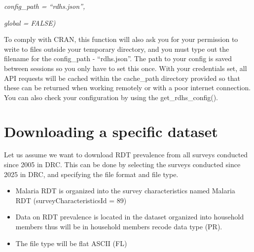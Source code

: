 \documentclass[
  letterpaper,
  DIV=11,
  numbers=noendperiod]{scrreprt}
\newenvironment{Shaded}{\begin{snugshade}}{\end{snugshade}}
\newcommand{\AttributeTok}[1]{\textcolor[rgb]{0.40,0.45,0.13}{#1}}
\newcommand{\CommentTok}[1]{\textcolor[rgb]{0.37,0.37,0.37}{#1}}
\newcommand{\DecValTok}[1]{\textcolor[rgb]{0.68,0.00,0.00}{#1}}
\newcommand{\FunctionTok}[1]{\textcolor[rgb]{0.28,0.35,0.67}{#1}}
\newcommand{\NormalTok}[1]{\textcolor[rgb]{0.00,0.23,0.31}{#1}}
\newcommand{\OtherTok}[1]{\textcolor[rgb]{0.00,0.23,0.31}{#1}}
\newcommand{\StringTok}[1]{\textcolor[rgb]{0.13,0.47,0.30}{#1}}
\begin{document}
\emph{config\_path = ``rdhs.json'',}

\emph{global = FALSE)}

To comply with CRAN, this function will also ask you for your permission
to write to files outside your temporary directory, and you must type
out the filename for the config\_path - ``rdhs.json''. The path to your
config is saved between sessions so you only have to set this once. With
your credentials set, all API requests will be cached within the
cache\_path directory provided so that these can be returned when
working remotely or with a poor internet connection. You can also check
your configuration by using the get\_rdhs\_config().

\hypertarget{downloading-a-specific-dataset}{%
\section{Downloading a specific
dataset}\label{downloading-a-specific-dataset}}

Let us assume we want to download RDT prevalence from all surveys
conducted since 2005 in DRC. This can be done by selecting the surveys
conducted since 2025 in DRC, and specifying the file format and file
type.

\begin{itemize}
\item
  Malaria RDT is organized into the survey characteristics named Malaria
  RDT (surveyCharacteristicsId = 89)
\item
  Data on RDT prevalence is located in the dataset organized into
  household members thus will be in household members recode data type
  (PR).
\item
  The file type will be flat ASCII (FL)
\end{itemize}

\begin{Shaded}
\end{Shaded}
\end{document}
